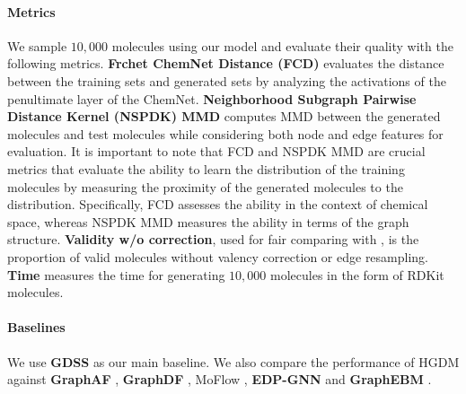 \documentclass[letterpaper]{article} %
\begin{document}
\paragraph{Metrics}
We sample $10,000$ molecules using our model and evaluate their quality with the following metrics. \textbf{Frchet ChemNet Distance (FCD)} \cite{preuer2018frechet} evaluates the distance between the training sets and generated sets by analyzing the activations of the penultimate layer of the ChemNet. \textbf{Neighborhood Subgraph Pairwise Distance Kernel (NSPDK) MMD} \cite{costa2010fast} computes MMD between the generated molecules and test molecules while considering both node and edge features for evaluation. It is important to note that FCD and NSPDK MMD are crucial metrics that evaluate the ability to learn the distribution of the training molecules by measuring the proximity of the generated molecules to the distribution. Specifically, FCD assesses the ability in the context of chemical space, whereas NSPDK MMD measures the ability in terms of the graph structure. \textbf{Validity w/o correction},  used for fair comparing with \cite{jo2022score}, is the proportion of valid molecules without valency correction or edge resampling. \textbf{Time} measures the time for generating $10,000$ molecules in the form of RDKit molecules.



\paragraph{Baselines}
We use \textbf{GDSS} \cite{jo2022score} as our main baseline. We also compare the performance of HGDM against \textbf{GraphAF} \cite{shi2020graphaf}, \textbf{GraphDF} \cite{luo2021graphdf}, MoF\textbf{}low \cite{zang2020moflow}, \textbf{EDP-GNN} \cite{niu2020permutation} and \textbf{GraphEBM} \cite{liu2021graphebm}.
\begin{table}
\Huge
\centering
{}
\caption{Generation results of the variants of GDSS and HGDM on the QM9 dataset.}
\label{Ablation}
\end{table}
\end{document}

